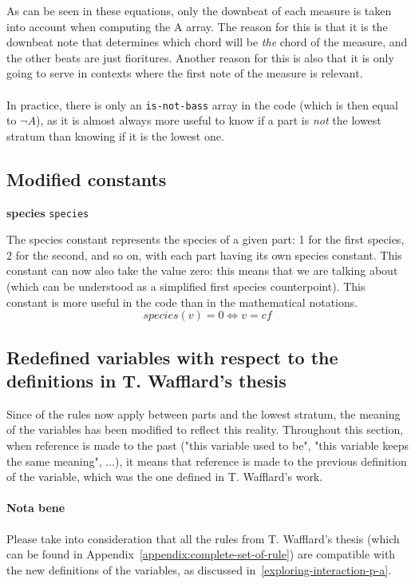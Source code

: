 As can be seen in these equations, only the downbeat of each measure is taken into account when computing the A array. The reason for this is that it is the downbeat note that determines which chord will be \textit{the} chord of the measure, and the other beats are just fioritures. Another reason for this is also that it is only going to serve in contexts where the first note of the measure is relevant.

\paragraph{}
In practice, there is only an \texttt{is-not-bass} array in the code (which is then equal to $\neg A$), as it is almost always more useful to know if a part is \textit{not} the lowest stratum than knowing if it is the lowest one. 

\subsection{Modified constants} \label{subsection:modified_constants}
\noindent \textbf{species} \hspace{.2cm} \texttt{species} 

The species constant represents the species of a given part: 1 for the first species, 2 for the second, and so on, with each part having its own species constant. This constant can now also take the value zero: this means that we are talking about \cfs (which can be understood as a simplified first species counterpoint). This constant is more useful in the code than in the mathematical notations.
\begin{equation}
species(v) = 0 \iff v = cf
\end{equation}

\subsection{Redefined variables with respect to the definitions in T. Wafflard's thesis} \label{subsection:modified_variables}
Since of the rules now apply between parts and the lowest stratum, the meaning of the variables has been modified to reflect this reality. Throughout this section, when reference is made to the past ("this variable used to be", "this variable keeps the same meaning", ...), it means that reference is made to the previous definition of the variable, which was the one defined in T. Wafflard's work.

\paragraph{Nota bene}
Please take into consideration that all the rules from T. Wafflard's thesis (which can be found in Appendix~\ref{appendix:complete-set-of-rule}) are compatible with the new definitions of the variables, as discussed in~\ref{exploring-interaction-p-a}. 

